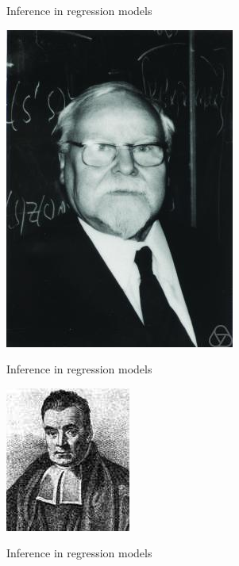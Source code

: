 \documentclass[10pt]{beamer}
\begin{document}
\begin{frame}{Inference in regression models}
  \vspace{-1.5cm}
  \begin{flushright}
    \includegraphics[width=\threefig]{Figures/tykhonov.jpg}
  \end{flushright}
  \vfill 
\end{frame}

\begin{frame}{Inference in regression models}
  \vspace{-1.5cm}
  \begin{flushright}
    \includegraphics[width=\threefig]{Figures/bayes}
  \end{flushright}
  \vfill 
\end{frame}

\begin{frame}{Inference in regression models}
\end{frame}

\end{document}
